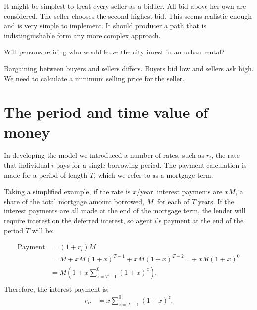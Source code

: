 It might be simplest to treat every seller as a bidder. All bid above her own are considered. The seller chooses the second highest bid. This  seems realistic enough and is very simple to implement. It should producer a path that is indistinguishable form any more complex approach. 

Will persons retiring who would leave the city invest in an urban rental?

Bargaining between buyers and sellers differs. Buyers bid low and sellers ask high. {\color{red}We need to calculate a minimum selling price for the seller}.


\section{The period and time value of money}

In developing the model we introduced a number of rates, such as $r_i$, the rate that individual $i$ pays for a single borrowing period. The payment calculation is made for a period of length $T$, which we refer to as a mortgage term.

Taking a simplified example, if the rate is $x$/year, interest payments are $xM$, a share of the total mortgage amount borrowed, $M$, for each of $T$ years. 
If the interest payments are all made at the end of the mortgage term, the lender will require interest on the deferred interest, so agent $i$'s payment at the end of the period $T$ will be:

\begin{align*}
\text{Payment} &= (1+r_i)M                                            \\ 
    &= M + xM(1+x)^{T-1}+ xM(1+x)^{T-2}\dots + xM(1+x)^{0} \\
    &= M\left(1+ x\sum_{z=T-1}^0(1+x)^{z}\right).          \\ 
\end{align*}
Therefore, the interest payment is:
\begin{align*}
r_i.   &=x\sum_{z=T-1}^0(1+x)^{z}.
\end{align*}


